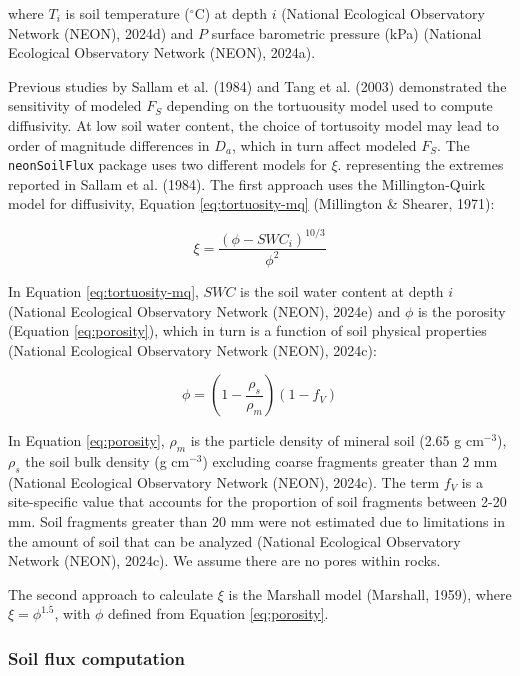 \documentclass[
  letterpaper,
  DIV=11,
  numbers=noendperiod]{scrartcl}
\begin{document}
where \(T_{i}\) is soil temperature (\(^\circ\)C) at depth \(i\)
(National Ecological Observatory Network (NEON), 2024d) and \(P\)
surface barometric pressure (kPa) (National Ecological Observatory
Network (NEON), 2024a).

Previous studies by Sallam et al. (1984) and Tang et al. (2003)
demonstrated the sensitivity of modeled \(F_{S}\) depending on the
tortuousity model used to compute diffusivity. At low soil water
content, the choice of tortusoity model may lead to order of magnitude
differences in \(D_{a}\), which in turn affect modeled \(F_{S}\). The
\texttt{neonSoilFlux} package uses two different models for \(\xi\).
representing the extremes reported in Sallam et al. (1984). The first
approach uses the Millington-Quirk model for diffusivity, Equation
\ref{eq:tortuosity-mq} (Millington \& Shearer, 1971):

\begin{equation}
  \xi = \frac{(\phi - SWC_{i})^{10/3}}{\phi^{2}}
  \label{eq:tortuosity-mq}
\end{equation}

In Equation \ref{eq:tortuosity-mq}, \(SWC\) is the soil water content at
depth \(i\) (National Ecological Observatory Network (NEON), 2024e) and
\(\phi\) is the porosity (Equation \ref{eq:porosity}), which in turn is
a function of soil physical properties (National Ecological Observatory
Network (NEON), 2024c):

\begin{equation}
  \phi = \left(1- \frac{\rho_{s}}{\rho_{m}} \right) \left(1-f_{V}\right)
  \label{eq:porosity}
\end{equation}

In Equation \ref{eq:porosity}, \(\rho_{m}\) is the particle density of
mineral soil (2.65 g cm\(^{-3}\)), \(\rho_{s}\) the soil bulk density (g
cm\(^{-3}\)) excluding coarse fragments greater than 2 mm (National
Ecological Observatory Network (NEON), 2024c). The term \(f_{V}\) is a
site-specific value that accounts for the proportion of soil fragments
between 2-20 mm. Soil fragments greater than 20 mm were not estimated
due to limitations in the amount of soil that can be analyzed (National
Ecological Observatory Network (NEON), 2024c). We assume there are no
pores within rocks.

The second approach to calculate \(\xi\) is the Marshall model
(Marshall, 1959), where \(\xi = \phi^{1.5}\), with \(\phi\) defined from
Equation \ref{eq:porosity}.

\subsubsection{Soil flux computation}\label{sec-compute-soil-flux}
\end{document}
